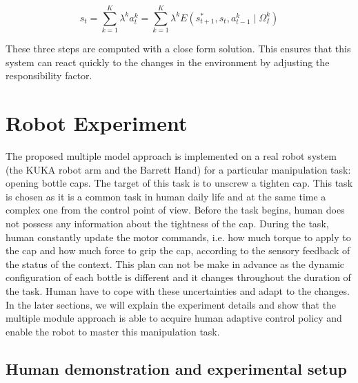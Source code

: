 \documentclass[preprint,12pt]{elsarticle}
\begin{document}
\begin{equation}
\label{e_mix}
s_t = \sum_{k=1}^K{\lambda^k a_t^k} = \sum_{k=1}^K{\lambda^k E\left({s^*_{t+1},s_t, a^k_{t-1} \mid \Omega^k_I}\right)}
\end{equation}

These three steps are computed with a close form solution. This ensures that this system can react quickly to the changes in the environment by adjusting the responsibility factor.





\section{Robot Experiment}
\label{sec:exp}
The proposed multiple model approach is implemented on a real robot system (the KUKA robot arm and the Barrett Hand) for a particular manipulation task: opening bottle caps. The target of this task is to unscrew a tighten cap. 
This task is chosen as it is a common task in human daily life and at the same time a complex one from the control point of view. 
Before the task begins, human does not possess any information about the tightness of the cap. During the task, human constantly update the motor commands, i.e. how much torque to apply to the cap and how much force to grip the cap, according to the sensory feedback of the status of the context. This plan can not be make in advance as the dynamic configuration of each bottle is different and it changes throughout the duration of the task. Human have to cope with these uncertainties and adapt to the changes. In the later sections, we will explain the experiment details and show that the multiple module approach is able to acquire human adaptive control policy and enable the robot to master this manipulation task.

\subsection{Human demonstration and experimental setup}
\label{sec:exp_demo}
\end{document}

